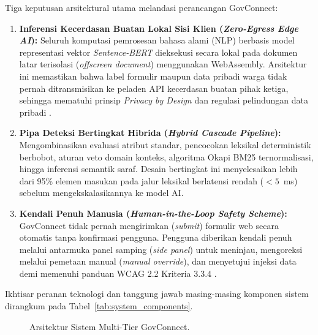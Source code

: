 \documentclass[conference]{IEEEtran}
\begin{document}
Tiga keputusan arsitektural utama melandasi perancangan GovConnect:
\begin{enumerate}[label=(\arabic*), leftmargin=*]
    \item \textbf{Inferensi Kecerdasan Buatan Lokal Sisi Klien (\textit{Zero-Egress Edge AI}):} Seluruh komputasi pemrosesan bahasa alami (NLP) berbasis model representasi vektor \textit{Sentence-BERT} dieksekusi secara lokal pada dokumen latar terisolasi (\textit{offscreen document}) menggunakan WebAssembly. Arsitektur ini memastikan bahwa label formulir maupun data pribadi warga tidak pernah ditransmisikan ke peladen API kecerdasan buatan pihak ketiga, sehingga mematuhi prinsip \textit{Privacy by Design} dan regulasi pelindungan data pribadi \cite{uupdp, W3C2024WebExtensions}.
    \item \textbf{Pipa Deteksi Bertingkat Hibrida (\textit{Hybrid Cascade Pipeline}):} Mengombinasikan evaluasi atribut standar, pencocokan leksikal deterministik berbobot, aturan veto domain konteks, algoritma Okapi BM25 ternormalisasi, hingga inferensi semantik saraf. Desain bertingkat ini menyelesaikan lebih dari 95\% elemen masukan pada jalur leksikal berlatensi rendah ($<5$~ms) sebelum mengekskalasikannya ke model AI.
    \item \textbf{Kendali Penuh Manusia (\textit{Human-in-the-Loop Safety Scheme}):} GovConnect tidak pernah mengirimkan (\textit{submit}) formulir web secara otomatis tanpa konfirmasi pengguna. Pengguna diberikan kendali penuh melalui antarmuka panel samping (\textit{side panel}) untuk meninjau, mengoreksi melalui pemetaan manual (\textit{manual override}), dan menyetujui injeksi data demi memenuhi panduan WCAG 2.2 Kriteria 3.3.4 \cite{W3C2023WCAG}.
\end{enumerate}

Ikhtisar peranan teknologi dan tanggung jawab masing-masing komponen sistem dirangkum pada Tabel~\ref{tab:system_components}.

\begin{figure}[!htbp]
\centering
{}
\caption{Arsitektur Sistem Multi-Tier GovConnect.}
\label{fig:arsitektur_sistem}
\end{figure}
\end{document}
